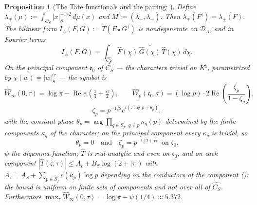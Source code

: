 \documentclass[11pt]{amsart}
\newtheorem{proposition}[theorem]{Proposition}
\theoremstyle{definition}
\theoremstyle{remark}
\newcommand{\Rel}{\operatorname{Re}}
\newcommand{\Knat}{K^{\natural}}
\newcommand{\DA}{\mathcal D_A}
\begin{document}
\begin{proposition}[The Tate functionals and the pairing;
{\cite[Thms.~7.1, 7.2, 7.4, 8.4]{Companion}}]\label{prop:tate}
Define $\lambda_\mp(\mu):=\int_{C_S}|x|_S^{\mp1/2}\,d\mu(x)$ and
$M:=(\lambda_-,\lambda_+)$. Then $\lambda_\mp(F^\dagger)
=\overline{\lambda_\pm(F)}$. The bilinear form
$I_A(F,G):=T(F\star G^\dagger)$ is nondegenerate on $\DA$, and in Fourier
terms
\begin{equation}\label{eq:planch}
  I_A(F,G)=\int_{\widehat{C_S}}\widehat F(\chi)\,\overline{\widehat G(\chi)}\,
    \widehat T(\chi)\,d\chi .
\end{equation}
On the principal component $\mathfrak c_0$ of $\widehat{C_S}$ --- the
characters trivial on $\Knat$, parametrized by $\chi(w)=|w|_S^{i\tau}$ --- the
symbol is
\begin{equation}\label{eq:symbol}
  \widehat W_\infty(0,\tau)=\log\pi
    -\Rel\psi\!\left(\tfrac14+\tfrac{i\tau}2\right),
  \qquad
  \widehat W_p(\mathfrak c_0,\tau)=(\log p)\cdot2\Rel\!\left(
    \frac{\zeta_p}{1-\zeta_p}\right),
\end{equation}
\begin{equation}\label{eq:zetap}
  \zeta_p=p^{-1/2}e^{i(\tau\log p+\theta_p)},
\end{equation}
with the constant phase $\theta_p=\arg\prod_{q\in S_f,\ q\ne p}\kappa_q(p)$
determined by the finite components $\kappa_q$ of the character; on the
principal component every $\kappa_q$ is trivial, so
\begin{equation}\label{eq:nophase}
  \theta_p=0\quad\text{and}\quad\zeta_p=p^{-1/2+i\tau}\ \text{ on }
  \mathfrak c_0 .
\end{equation}
$\psi$ the digamma function; $\widehat T$ is real-analytic and even on
$\mathfrak c_0$, and on each component $|\widehat T(\mathfrak c,\tau)|\le
A_{\mathfrak c}+B_S\log(2+|\tau|)$ with $A_{\mathfrak c}=A_S+\sum_{p\in S_f}
c(\kappa_p)\log p$ depending on the conductors of the component
(\cite[Lemma~8.12, (76)]{Companion}): the bound is uniform on finite sets of
components and not over all of $\widehat{C_S}$. Furthermore $\max_\tau\widehat W_\infty(0,\tau)
=\log\pi-\psi(1/4)\approx5.372$.
\end{proposition}
\end{document}
